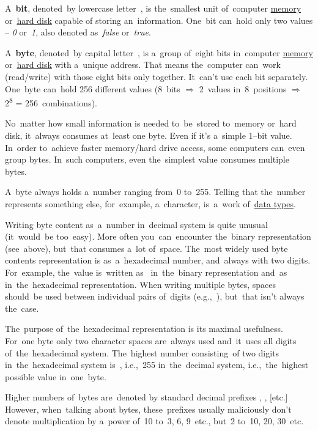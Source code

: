 \label{bitsbytes}
A~\textbf{bit}, denoted~by lowercase letter~, is the~smallest unit of~computer \hyperref[systemmemory]{memory} or~\hyperref[harddiskdrive]{hard disk} capable of storing an~information.
One~bit can~hold only two values -- \textit{0} or~\textit{1}, also denoted as~\textit{false} or~\textit{true}.

A~\textbf{byte}, denoted~by capital letter~, is a~group of~eight bits in~computer \hyperref[systemmemory]{memory} or~\hyperref[harddiskdrive]{hard disk} with a~unique address.
That means the~computer can~work (read/write) with those eight bits only together.
It~can't use each bit separately.
One~byte can~hold 256 different values (8~bits $\Rightarrow$ 2~values in~8~positions $\Rightarrow$ 2\textsuperscript{8} = 256~combinations).

No~matter how small information is needed to~be~stored to~memory or~hard disk, it~always consumes at~least one byte.
Even if it's a~simple \mbox{1--bit}  value.
In~order to~achieve faster memory/hard drive access, some computers can~even group bytes.
In~such computers, even the~simplest  value consumes multiple bytes.

A~byte always holds a~number ranging from~0 to~255.
Telling that the~number represents something else, for~example, a~character, is~a~work of~\hyperref[datatypes]{data types}.

Writing byte content as~a~number in~decimal system is quite unusual (it~would~be too~easy).
More often you~can~encounter the~binary representation (see~above), but~that consumes a~lot of~space.
The~most widely used byte contents representation is as~a~hexadecimal number, and~always with two digits.
For~example, the~value  is~written as~ in~the~binary representation and~as~ in~the~hexadecimal representation.
When writing multiple bytes, spaces should~be used between individual pairs of~digits (e.g.,~), but~that isn't always the~case.

The~purpose of~the~hexadecimal representation is its maximal usefulness.
For~one byte only two character spaces are~always used and~it~uses all digits of~the~hexadecimal system.
The~highest number consisting~of two digits in~the~hexadecimal system is~, i.e.,~255 in~the~decimal system, i.e.,~the~highest possible value in~one~byte.

\warningnonl Higher numbers of~bytes are~denoted by standard decimal prefixes , , [etc.]
However, when~talking about bytes, these~prefixes usually maliciously don't denote multiplication by a~power of~10 to~3, 6, 9~etc., but~2 to~10, 20, 30~etc.

